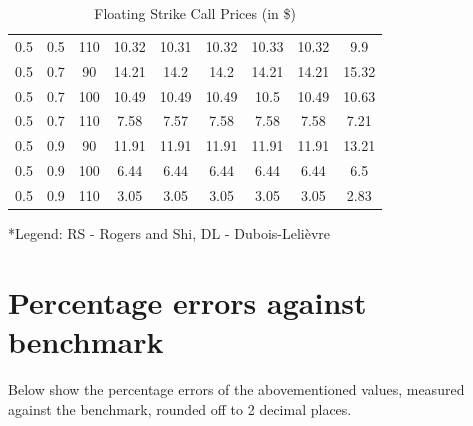 \documentclass[12pt]{report}
\begin{document}
\begin{table}[H]
\begin{tabular}{|c|c|c|c|c|c|c|c|c|}
  0.5 & 0.5 & 110 & 10.32 & 10.31 & 10.32 & 10.33 & 10.32 & 9.9 \\
  0.5 & 0.7 & 90 & 14.21 & 14.2 & 14.2 & 14.21 & 14.21 & 15.32 \\
  0.5 & 0.7 & 100 & 10.49 & 10.49 & 10.49 & 10.5 & 10.49 & 10.63 \\
  0.5 & 0.7 & 110 & 7.58 & 7.57 & 7.58 & 7.58 & 7.58 & 7.21 \\
  0.5 & 0.9 & 90 & 11.91 & 11.91 & 11.91 & 11.91 & 11.91 & 13.21 \\
  0.5 & 0.9 & 100 & 6.44 & 6.44 & 6.44 & 6.44 & 6.44 & 6.5 \\
  0.5 & 0.9 & 110 & 3.05 & 3.05 & 3.05 & 3.05 & 3.05 & 2.83 \\
  \hline
  \end{tabular}
  \caption{Floating Strike Call Prices (in \$)}
  \label{table:name}
\end{table}
\scriptsize
*Legend: RS - Rogers and Shi, DL - Dubois-Leli\`{e}vre
\normalsize

\section{Percentage errors against benchmark}
Below show the percentage errors of the abovementioned values, measured against the benchmark, rounded off to 2 decimal places.
\end{document}
